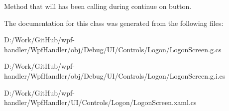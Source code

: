 Method that will has been calling during continue on button. 



The documentation for this class was generated from the following files\+:\begin{DoxyCompactItemize}
\item 
D\+:/\+Work/\+Git\+Hub/wpf-\/handler/\+Wpf\+Handler/obj/\+Debug/\+U\+I/\+Controls/\+Logon/Logon\+Screen.\+g.\+cs\item 
D\+:/\+Work/\+Git\+Hub/wpf-\/handler/\+Wpf\+Handler/obj/\+Debug/\+U\+I/\+Controls/\+Logon/Logon\+Screen.\+g.\+i.\+cs\item 
D\+:/\+Work/\+Git\+Hub/wpf-\/handler/\+Wpf\+Handler/\+U\+I/\+Controls/\+Logon/Logon\+Screen.\+xaml.\+cs\end{DoxyCompactItemize}
